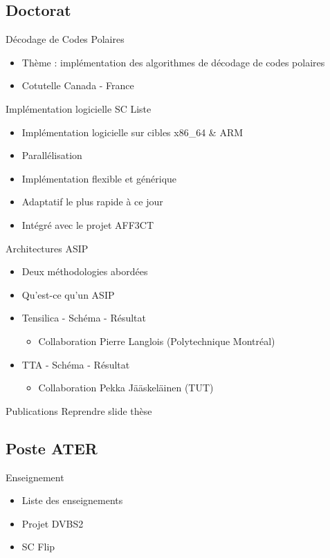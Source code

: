 \documentclass[t,compress,mathserif,12pt,xcolor=dvipsnames]{beamer}
\begin{document}
\subsection{Doctorat}
\begin{frame}[c]{Décodage de Codes Polaires}
  \begin{itemize}
    \item Thème : implémentation des algorithmes de décodage de codes polaires
    \item Cotutelle Canada - France
  \end{itemize}
\end{frame}
\begin{frame}[c]{Implémentation logicielle SC Liste}
  \begin{itemize}
    \item Implémentation logicielle sur cibles x86\_64 \& ARM
    \item Parallélisation
    \item Implémentation flexible et générique
    \item Adaptatif le plus rapide à ce jour
    \item Intégré avec le projet AFF3CT
  \end{itemize}
\end{frame}
\begin{frame}[c]{Architectures ASIP}
  \begin{itemize}
    \item Deux méthodologies abordées
    \item Qu'est-ce qu'un ASIP
    \item Tensilica - Schéma - Résultat
    \begin{itemize}
      \item Collaboration Pierre Langlois (Polytechnique Montréal)
    \end{itemize}
    \item TTA - Schéma - Résultat
    \begin{itemize}
      \item Collaboration Pekka Jääskeläinen (TUT)
    \end{itemize}
  \end{itemize}
\end{frame}
\begin{frame}[c]{Publications}
  Reprendre slide thèse
\end{frame}

\subsection{Poste ATER}
\begin{frame}[c]{Enseignement}
  \begin{itemize}
    \item Liste des enseignements
    \item Projet DVBS2
    \item SC Flip
  \end{itemize}
\end{frame} 
\end{document}
